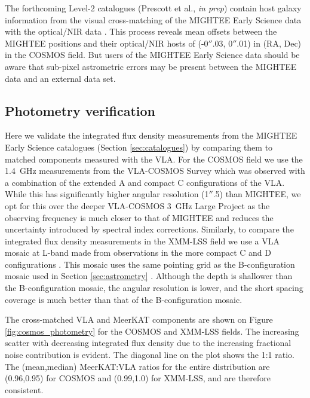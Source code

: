 \documentclass[usenatbib,usedcolumn]{mnras}
\begin{document}
The forthcoming Level-2 catalogues (Prescott et al., \emph{in prep}) contain host galaxy information from the visual cross-matching of the MIGHTEE Early Science data with the optical/NIR data \citep[the latter being tied to the GAIA DR2 astrometric frame;][]{gordon2021}. This process reveals mean offsets between the MIGHTEE positions and their optical/NIR hosts of (-0$''$.03, 0$''$.01) in (RA, Dec) in the COSMOS field. But users of the MIGHTEE Early Science data should be aware that sub-pixel astrometric errors may be present between the MIGHTEE data and an external data set.




\subsection{Photometry verification}
\label{sec:photometry}



Here we validate the integrated flux density measurements from the MIGHTEE Early Science catalogues (Section \ref{sec:catalogues}) by comparing them to matched components measured with the VLA. For the COSMOS field we use the
1.4~GHz measurements from the VLA-COSMOS Survey \citep{schinnerer2010} which was observed with a combination of the extended A and compact C configurations of the VLA. While this has significantly higher angular resolution (1$''$.5) than MIGHTEE, we opt for this over the deeper VLA-COSMOS 3~GHz Large Project \citep{smolcic2017} as the observing frequency is much closer to that of MIGHTEE and reduces the uncertainty introduced by spectral index corrections. Similarly, to compare the integrated flux density measurements in the XMM-LSS field we use a VLA mosaic at L-band made from observations in the more compact C and D configurations \citep{peters2019}. This mosaic uses the same pointing grid as the B-configuration mosaic used in Section \ref{sec:astrometry} \citep{heywood2020a}. Although the depth is shallower than the B-configuration mosaic, the angular resolution is lower, and the short spacing coverage is much better than that of the B-configuration mosaic.

The cross-matched VLA and MeerKAT components are shown on Figure \ref{fig:cosmos_photometry} for the COSMOS and XMM-LSS fields. The increasing scatter with decreasing integrated flux density due to the increasing fractional noise contribution is evident. The diagonal line on the plot shows the 1:1 ratio. The (mean,median) MeerKAT:VLA ratios for the entire distribution are (0.96,0.95) for COSMOS and (0.99,1.0) for XMM-LSS, and are therefore consistent.
\end{document}
